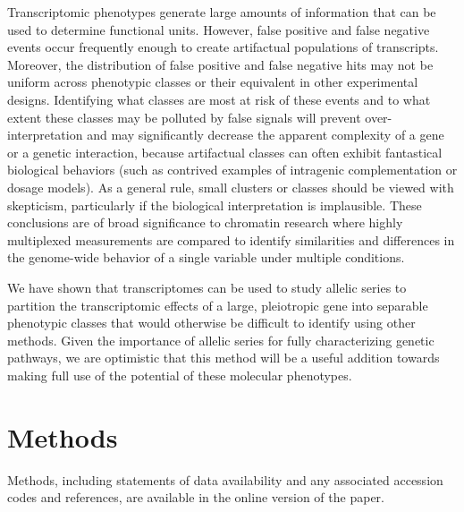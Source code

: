 \documentclass[8pt, twocolumn]{article}
\begin{document}
Transcriptomic phenotypes generate large amounts of information that can be used
to determine functional units. However, false positive and false negative events
occur frequently enough to create artifactual populations of transcripts.
Moreover, the distribution of false positive and false negative hits may not be
uniform across phenotypic classes or their equivalent in other experimental
designs. Identifying what classes are most at risk of these events and to what
extent these classes may be polluted by false signals will prevent
over-interpretation and may significantly decrease the apparent complexity of a
gene or a genetic interaction, because artifactual classes can often exhibit
fantastical biological behaviors (such as contrived examples of intragenic
complementation or dosage models). As a general rule, small clusters or classes
should be viewed with skepticism, particularly if the biological interpretation
is implausible. These conclusions are of broad significance to chromatin
research where highly multiplexed measurements are compared to identify
similarities and differences in the genome-wide behavior of a single variable
under multiple conditions.

We have shown that transcriptomes can be used to study allelic series to
partition the transcriptomic effects of a large, pleiotropic gene into separable
phenotypic classes that would otherwise be difficult to identify using other
methods. Given the importance of allelic series for fully characterizing
genetic pathways, we are optimistic that this method will be a useful addition
towards making full use of the potential of these molecular phenotypes.


\section*{Methods}
\label{sec:methods}
Methods, including statements of data availability and any associated
accession codes and references, are available in the online version of
the paper.
\end{document}
